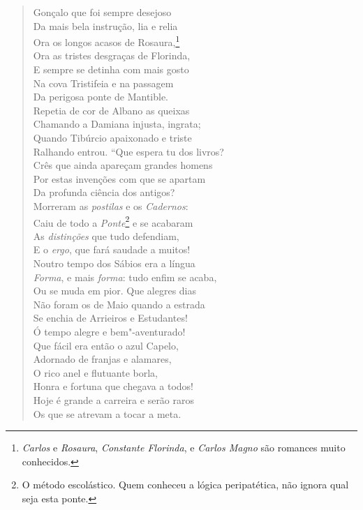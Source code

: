 \begin{verse}
Gonçalo que foi sempre desejoso\\
Da mais bela instrução, lia e relia\\
Ora os longos acasos de Rosaura,\footnote{ \textit{Carlos} e
\textit{Rosaura}, \textit{Constante Florinda}, e \textit{Carlos Magno} são
romances muito conhecidos.}\\ 
Ora as tristes desgraças de Florinda,\\ 	\index{\Romvulg}
E sempre se detinha com mais gosto\\
Na cova Tristifeia e na passagem\\
Da perigosa ponte de Mantible.\\
Repetia de cor de Albano as queixas\\
Chamando a Damiana injusta, ingrata;\\
Quando Tibúrcio apaixonado e triste\\
Ralhando entrou. ``Que espera tu dos livros?\\
Crês que ainda apareçam grandes homens\\
Por estas invenções com que se apartam\\
Da profunda ciência dos antigos?\\
Morreram as \textit{postilas} e os \textit{Cadernos}:\\
Caiu de todo a \textit{Ponte}\footnote{ O método escolástico. Quem
conheceu a lógica peripatética, não ignora qual seja esta ponte.} e se acabaram\\		\index{\Perip}
As \textit{distinções} que tudo defendiam,\\
E o \textit{ergo}, que fará saudade a muitos!\\
Noutro tempo dos Sábios era a língua\\
\textit{Forma}, e mais \textit{forma}: tudo enfim se acaba,\\
Ou se muda em pior. Que alegres dias\\
Não foram os de Maio quando a estrada\\
Se enchia de Arrieiros e Estudantes!\\
Ó tempo alegre e bem"-aventurado!\\
Que fácil era então o azul Capelo,\\
Adornado de franjas e alamares,\\
O rico anel e flutuante borla,\\
Honra e fortuna que chegava a todos!\\
Hoje é grande a carreira e serão raros\\
Os que se atrevam a tocar a meta.\\

\end{verse}
